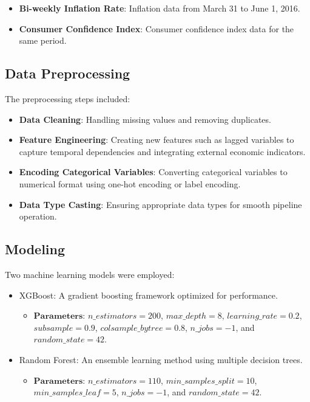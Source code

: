 \documentclass[letterpaper, 10 pt, conference]{ieeeconf}  %
\begin{document}
\begin{itemize}
        \item \textbf{Bi-weekly Inflation Rate}: Inflation data from March 31 to June 1, 2016.
        \item \textbf{Consumer Confidence Index}: Consumer confidence index data for the same period.
\end{itemize}

\subsection{Data Preprocessing}
The preprocessing steps included:
\begin{itemize}
        \item \textbf{Data Cleaning}: Handling missing values and removing duplicates.
        \item \textbf{Feature Engineering}: Creating new features such as lagged variables to capture temporal dependencies and integrating external economic indicators.
        \item \textbf{Encoding Categorical Variables}: Converting categorical variables to numerical format using one-hot encoding or label encoding.
        \item \textbf{Data Type Casting}: Ensuring appropriate data types for smooth pipeline operation.
\end{itemize}

\subsection{Modeling}
Two machine learning models were employed:
\begin{itemize}
        \item XGBoost: A gradient boosting framework optimized for performance.
        \begin{itemize}
                \item $\textbf{Parameters}$: $n\_estimators=200$, $max\_depth=8$, $learning\_rate=0.2$, $subsample=0.9$, $colsample\_bytree=0.8$, $n\_jobs=-1$, and $random\_state=42$.
        \end{itemize}
        \item Random Forest: An ensemble learning method using multiple decision trees.
        \begin{itemize}
                \item $\textbf{Parameters}$: $n\_estimators=110$, $min\_samples\_split=10$, $min\_samples\_leaf=5$, $n\_jobs=-1$, and $random\_state=42$.
        \end{itemize}
\end{itemize}
\end{document}
